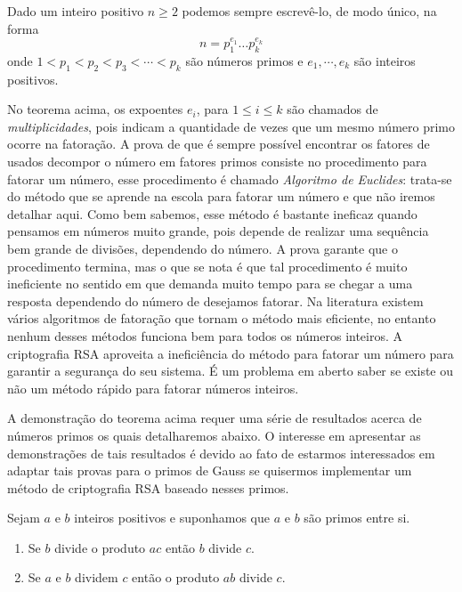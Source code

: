 \begin{Th}
\label{fat.unica} 
Dado um inteiro positivo $n\geq 2$ podemos sempre escrev\^e-lo, de modo \'unico, na forma
$$n=p_{1}^{e_1}\dots p_{k}^{e_k}$$
onde $1<p_1<p_2<p_3<\cdots<p_k$ s\~ao n\'umeros primos e $e_1, \cdots, e_k$ s\~ao inteiros positivos.
\end{Th}

No teorema acima, os expoentes $e_i$, para $1\leq i\leq k$ s\~ao chamados de \textit{multiplicidades}, pois indicam a quantidade de vezes que um mesmo n\'umero primo ocorre na fatora\c{c}\~ao. A prova de que \'e sempre poss\'ivel encontrar os fatores de usados decompor o n\'umero em fatores primos consiste no procedimento para fatorar um n\'umero, esse procedimento \'e chamado \textit{Algoritmo de Euclides}: trata-se do m\'etodo que se aprende na escola para fatorar
um n\'umero e que n\~ao iremos detalhar aqui. Como bem sabemos, esse m\'etodo \'e bastante ineficaz quando pensamos em n\'umeros muito grande, pois depende de realizar uma sequ\^encia bem grande de divis\~oes, dependendo do n\'umero. A prova garante que o procedimento termina, mas o que se nota \'e que tal procedimento \'e muito ineficiente no sentido em que demanda muito tempo para se chegar a uma resposta dependendo do n\'umero de desejamos fatorar. Na literatura existem v\'arios algoritmos de fatora\c{c}\~ao que tornam o m\'etodo mais eficiente, no entanto nenhum desses m\'etodos funciona bem para todos os n\'umeros inteiros. A criptografia RSA aproveita a inefici\^encia do m\'etodo para fatorar um n\'umero para garantir a seguran\c{c}a do seu sistema. \'E um problema em aberto saber se existe ou n\~ao um m\'etodo r\'apido para fatorar n\'umeros inteiros.  

A demonstra\c{c}\~ao do teorema acima requer uma s\'erie de resultados acerca de n\'umeros primos os quais detalharemos abaixo. O interesse em apresentar as demonstra\c{c}\~oes de tais resultados \'e devido ao fato de estarmos interessados em adaptar tais provas para o primos de Gauss se quisermos implementar um m\'etodo de criptografia RSA baseado nesses primos. 

\begin{Th}\label{propriedade_de_primos}
Sejam $a$ e $b$ inteiros positivos e suponhamos que $a$ e $b$ s\~ao primos entre si.
\begin{enumerate}
\item Se $b$ divide o produto $ac$ ent\~ao $b$ divide $c$.
\item Se $a$ e $b$ dividem $c$ ent\~ao o produto $ab$ divide $c$.
\end{enumerate}
\end{Th}

